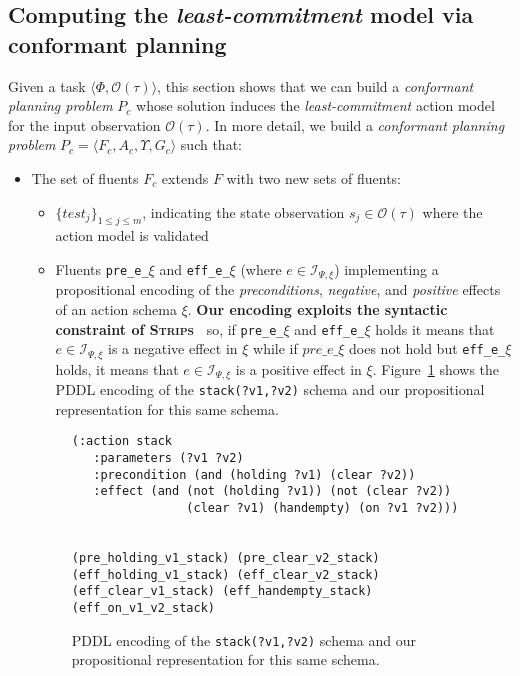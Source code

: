 \documentclass{article}
\newcommand{\tup}[1]{{\langle #1 \rangle}}
\newcommand{\strips}{\textsc{Strips}}
\begin{document}
\subsection{Computing the {\em least-commitment} model via conformant planning}
Given a task $\tup{\Phi,\mathcal{O}(\tau)}$, this section shows that we can build a {\em conformant planning problem} $P_c$ whose solution induces the {\em least-commitment} action model for the input observation $\mathcal{O}(\tau)$. In more detail, we build a {\em conformant planning problem} $P_c=\tup{F_c,A_c,\Upsilon,G_c}$ such that:
\begin{itemize}
\item The set of fluents $F_c$ extends $F$ with two new sets of fluents:
      \begin{itemize}
      \item $\{test_j\}_{1\leq j\leq m}$, indicating the state observation $s_j\in\mathcal{O}(\tau)$ where the action model is validated
      \item Fluents {\tt\small pre\_e\_$\xi$} and {\tt\small eff\_e\_$\xi$} (where $e\in{\mathcal I}_{\Psi,\xi}$) implementing a propositional encoding of the {\em preconditions}, {\em negative}, and {\em positive} effects of an action schema $\xi$. {\bf Our encoding exploits the syntactic constraint of \strips\ } so, if {\tt\small pre\_e\_$\xi$} and {\tt\small eff\_e\_$\xi$} holds it means that $e\in{\mathcal I}_{\Psi,\xi}$ is a negative effect in $\xi$ while if $pre\_e\_\xi$ does not hold but {\tt\small eff\_e\_$\xi$} holds, it means that $e\in{\mathcal I}_{\Psi,\xi}$ is a positive effect in $\xi$. Figure~\ref{fig:propositional} shows the PDDL encoding of the {\tt\small stack(?v1,?v2)} schema and our propositional representation for this same schema.
      \end {itemize}

\begin{figure}
  \begin{tiny}  
  \begin{verbatim}
(:action stack
   :parameters (?v1 ?v2)
   :precondition (and (holding ?v1) (clear ?v2))
   :effect (and (not (holding ?v1)) (not (clear ?v2))
                (clear ?v1) (handempty) (on ?v1 ?v2)))


(pre_holding_v1_stack) (pre_clear_v2_stack)
(eff_holding_v1_stack) (eff_clear_v2_stack)
(eff_clear_v1_stack) (eff_handempty_stack) (eff_on_v1_v2_stack)
  \end{verbatim}           
  \end{tiny}  
 \caption{\small PDDL encoding of the {\tt\small stack(?v1,?v2)} schema and our propositional representation for this same schema.}
\label{fig:propositional}
\end{figure}


\end{itemize}
\end{document}

